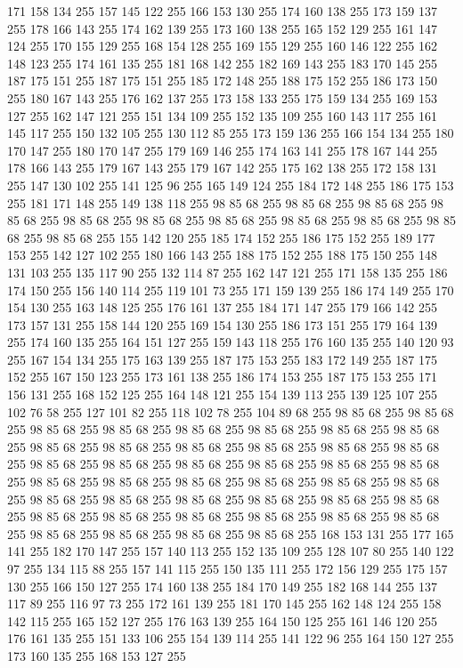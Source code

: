 171 158 134 255 157 145 122 255 166 153 130 255 174 160 138 255 173 159 137 255 178 166 143 255 174 162 139 255 173 160 138 255 165 152 129 255 161 147 124 255 170 155 129 255 168 154 128 255 169 155 129 255 160 146 122 255 162 148 123 255 174 161 135 255 181 168 142 255 182 169 143 255 183 170 145 255 187 175 151 255 187 175 151 255 185 172 148 255 188 175 152 255 186 173 150 255 180 167 143 255 176 162 137 255 173 158 133 255 175 159 134 255 169 153 127 255 162 147 121 255 151 134 109 255 152 135 109 255 160 143 117 255 161 145 117 255 150 132 105 255 130 112 85 255 173 159 136 255 166 154 134 255 180 170 147 255 180 170 147 255 179 169 146 255 174 163 141 255 178 167 144 255 178 166 143 255 179 167 143 255 179 167 142 255 175 162 138 255 172 158 131 255 147 130 102 255 141 125 96 255 165 149 124 255 184 172 148 255 186 175 153 255 181 171 148 255 149 138 118 255 98 85 68 255 98 85 68 255 98 85 68 255 98 85 68 255 98 85 68 255 98 85 68 255 98 85 68 255 98 85 68 255 98 85 68 255
98 85 68 255 98 85 68 255 155 142 120 255 185 174 152 255 186 175 152 255 189 177 153 255 142 127 102 255 180 166 143 255 188 175 152 255 188 175 150 255 148 131 103 255 135 117 90 255 132 114 87 255 162 147 121 255 171 158 135 255 186 174 150 255 156 140 114 255 119 101 73 255 171 159 139 255 186 174 149 255 170 154 130 255 163 148 125 255 176 161 137 255 184 171 147 255 179 166 142 255 173 157 131 255 158 144 120 255 169 154 130 255 186 173 151 255 179 164 139 255 174 160 135 255 164 151 127 255 159 143 118 255 176 160 135 255 140 120 93 255 167 154 134 255 175 163 139 255 187 175 153 255 183 172 149 255 187 175 152 255 167 150 123 255 173 161 138 255 186 174 153 255 187 175 153 255 171 156 131 255 168 152 125 255 164 148 121 255 154 139 113 255 139 125 107 255 102 76 58 255 127 101 82 255 118 102 78 255 104 89 68 255 98 85 68 255 98 85 68 255 98 85 68 255 98 85 68 255 98 85 68 255 98 85 68 255 98 85 68 255 98 85 68 255 98 85 68 255 98 85 68 255 98 85 68 255
98 85 68 255 98 85 68 255 98 85 68 255 98 85 68 255 98 85 68 255 98 85 68 255 98 85 68 255 98 85 68 255 98 85 68 255 98 85 68 255 98 85 68 255 98 85 68 255 98 85 68 255 98 85 68 255 98 85 68 255 98 85 68 255 98 85 68 255 98 85 68 255 98 85 68 255 98 85 68 255 98 85 68 255 98 85 68 255 98 85 68 255 98 85 68 255 98 85 68 255 98 85 68 255 98 85 68 255 98 85 68 255 98 85 68 255 98 85 68 255 98 85 68 255 168 153 131 255 177 165 141 255 182 170 147 255 157 140 113 255 152 135 109 255 128 107 80 255 140 122 97 255 134 115 88 255 157 141 115 255 150 135 111 255 172 156 129 255 175 157 130 255 166 150 127 255 174 160 138 255 184 170 149 255 182 168 144 255 137 117 89 255 116 97 73 255 172 161 139 255 181 170 145 255 162 148 124 255 158 142 115 255 165 152 127 255 176 163 139 255 164 150 125 255 161 146 120 255 176 161 135 255 151 133 106 255 154 139 114 255 141 122 96 255 164 150 127 255 173 160 135 255 168 153 127 255
